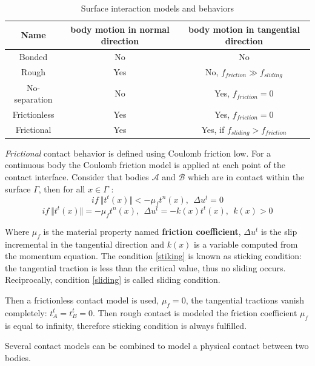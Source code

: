 \begin{table}[H]

\begin{center}
\begin{tabular}{||c|c|c||}
\hline
Name & body motion in normal direction & body motion in tangential direction \\
\hline\hline
Bonded & No & No\\
\hline
Rough & Yes & No, $f_{friction} \gg f_{sliding}$ \\
\hline
No-separation & No & Yes,  $f_{friction} = 0$ \\
\hline
Frictionless & Yes & Yes, $f_{friction} = 0$ \\
\hline
Frictional & Yes & Yes, if $f_{sliding} > f_{friction}$\\
\hline
\end{tabular}
\caption{Surface interaction models and behaviors}
\label{contactB}
\end{center}
\end{table}

\textit{Frictional} contact behavior is defined using Coulomb friction low.
For a continuous body the Coulomb friction model is applied at each point of the contact interface.
Consider that bodies $\mathcal{A}$ and $\mathcal{B}$ which are in contact within the surface $\Gamma$, then for all $x \in \Gamma$ :
\begin{equation}
\label{stiking}
if \ \Vert t^t(x) \Vert < -\mu_f t^n(x),\ \ \Delta u^t=0 
\end{equation}
\begin{equation}
\label{sliding}
if \ \Vert t^t(x) \Vert = -\mu_f t^n(x),\ \ \Delta u^t=-k(x)t^t(x),\ \ k(x)>0
\end{equation}

Where $\mu_f$ is the material property named \textbf{friction coefficient},  $\Delta u^t$ is the slip incremental in the tangential direction and $k(x)$ is a variable computed from the momentum equation. The condition \ref{stiking} is known as sticking condition: the tangential traction is less than the critical value, thus no sliding occurs. Reciprocally, condition \ref{sliding} is called sliding condition.

Then a frictionless contact model is used, $\mu_f = 0$, the tangential tractions vanish completely: $t_A^t = t_B^t = 0$. Then rough contact is modeled the friction coefficient $\mu_f$ is equal to infinity, therefore sticking condition is always fulfilled. 

Several contact models can be combined to model a physical contact between two bodies.   

